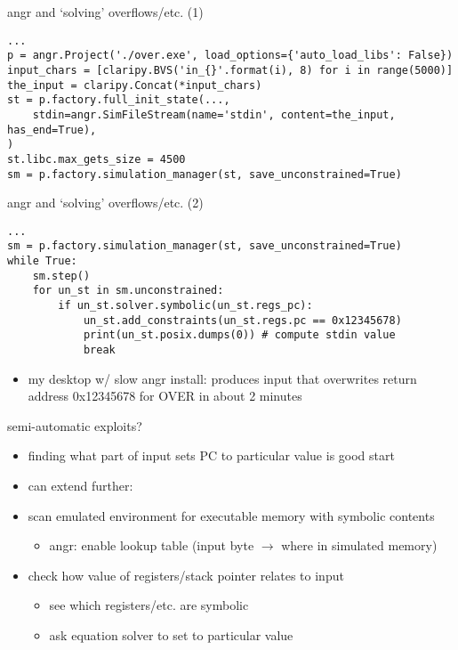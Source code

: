 \begin{frame}[fragile]{angr and `solving' overflows/etc. (1)}
\begin{Verbatim}[fontsize=\fontsize{9}{10}]
...
p = angr.Project('./over.exe', load_options={'auto_load_libs': False})
input_chars = [claripy.BVS('in_{}'.format(i), 8) for i in range(5000)]
the_input = claripy.Concat(*input_chars)
st = p.factory.full_init_state(...,
    stdin=angr.SimFileStream(name='stdin', content=the_input, has_end=True),
)
st.libc.max_gets_size = 4500
sm = p.factory.simulation_manager(st, save_unconstrained=True)
\end{Verbatim}
\end{frame}

\begin{frame}[fragile]{angr and `solving' overflows/etc. (2)}
\begin{Verbatim}[fontsize=\fontsize{9}{10}]
...
sm = p.factory.simulation_manager(st, save_unconstrained=True)
while True:
    sm.step()
    for un_st in sm.unconstrained:
        if un_st.solver.symbolic(un_st.regs_pc):
            un_st.add_constraints(un_st.regs.pc == 0x12345678)
            print(un_st.posix.dumps(0)) # compute stdin value
            break
\end{Verbatim}
\begin{itemize}
\item my desktop w/ slow angr install: produces input that overwrites return address 0x12345678 for OVER in about 2 minutes
\end{itemize}
\end{frame}

\begin{frame}{semi-automatic exploits?}
\begin{itemize}
\item finding what part of input sets PC to particular value is good start
\vspace{.5cm}
\item can extend further:
\item scan emulated environment for executable memory with symbolic contents
    \begin{itemize}
    \item angr: enable lookup table (input byte $\rightarrow$ where in simulated memory)
    \end{itemize}
\item check how value of registers/stack pointer relates to input
    \begin{itemize}
    \item see which registers/etc. are symbolic
    \item ask equation solver to set to particular value
    \end{itemize}
\end{itemize}
\end{frame}

